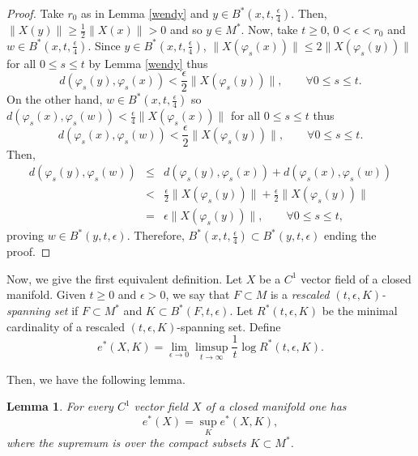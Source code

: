 \documentclass{amsart}
\newtheorem{lem}{Lemma}
\numberwithin{equation}{section}
\begin{document}
\begin{proof}
Take $r_0$ as in Lemma \ref{wendy} and $y\in B^*(x,t,\frac{\epsilon}4)$.
Then, $\|X(y)\|\geq \frac{1}2\|X(x)\|>0$ and so $y\in M^*$.
Now, take $t\geq0$, $0<\epsilon<r_0$ and $w\in B^*(x,t,\frac{\epsilon}4)$.
Since $y\in B^*(x,t,\frac{\epsilon}4)$, $\|X(\varphi_s(x))\|\leq 2\|X(\varphi_s(y))\|$ for all $0\leq s\leq t$ by Lemma \ref{wendy} thus
$$
d(\varphi_s(y),\varphi_s(x))<\frac{\epsilon}2\|X(\varphi_s(y))\|,\quad\quad\forall 0\leq s\leq t.
$$
On the other hand, $w\in B^*(x,t,\frac{\epsilon}4)$ so $d(\varphi_s(x),\varphi_s(w))<\frac{\epsilon}4\|X(\varphi_s(x))\|$ for all $0\leq s\leq t$ thus
$$
d(\varphi_s(x),\varphi_s(w))<\frac{\epsilon}2\|X(\varphi_s(y))\|,\quad\quad\forall 0\leq s\leq t.
$$
Then,
\begin{eqnarray*}
d(\varphi_s(y),\varphi_s(w))&\leq& d(\varphi_s(y),\varphi_s(x))+d(\varphi_s(x),\varphi_s(w))\\
&<&\frac{\epsilon}2\|X(\varphi_s(y))\|+\frac{\epsilon}2\|X(\varphi_s(y))\|\\
&=&\epsilon\|X(\varphi_s(y))\|,\quad\quad\forall 0\leq s\leq t,
\end{eqnarray*}
proving $w\in B^*(y,t,\epsilon)$. Therefore, $B^*(x,t,\frac{\epsilon}4)\subset
B^*(y,t,\epsilon)$ ending the proof.
\end{proof}




Now, we give the first equivalent definition.
Let $X$ be a $C^1$ vector field of a closed manifold.
Given $t\geq0$ and $\epsilon>0$, we say that $F\subset M$ is
a {\em rescaled $(t,\epsilon,K)$-spanning set} if $F\subset M^*$ and
$K\subset B^*(F,t,\epsilon)$.
Let $R^*(t,\epsilon,K)$ be the minimal cardinality of a rescaled $(t,\epsilon,K)$-spanning set.
Define
\begin{equation}
\label{bomba}
e^*(X,K)=\lim_{\epsilon\to0}\limsup_{t\to\infty}\frac{1}t\log R^*(t,\epsilon,K).
\end{equation}

Then, we have the following lemma.

\begin{lem}
\label{fria}
For every $C^1$ vector field $X$ of a closed manifold one has
$$
e^*(X)=\sup_{K}e^*(X,K),
$$
where the supremum is over the compact subsets $K\subset M^*$.
\end{lem}
\end{document}
